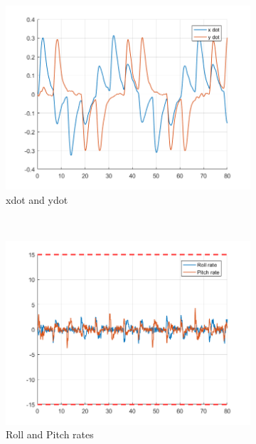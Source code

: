 \documentclass[11pt]{article}
\begin{document}
\begin{enumerate}
\begin{figure}[ht]
        \begin{subfigure}[c]{0.3\linewidth}
            \centering
            \includegraphics[width=\linewidth]{Plots_12_NonlinearModel_Hexagon/07}
            \caption{xdot and ydot}
        \end{subfigure}
        ~
        \begin{subfigure}[c]{0.3\linewidth}
            \centering
            \includegraphics[width=\linewidth]{Plots_12_NonlinearModel_Hexagon/08}
            \caption{Roll and Pitch rates}
        \end{subfigure}
        ~
        \begin{subfigure}[c]{0.3\linewidth}
            \centering

\end{subfigure}
\end{figure}
\end{enumerate}
\end{document}
